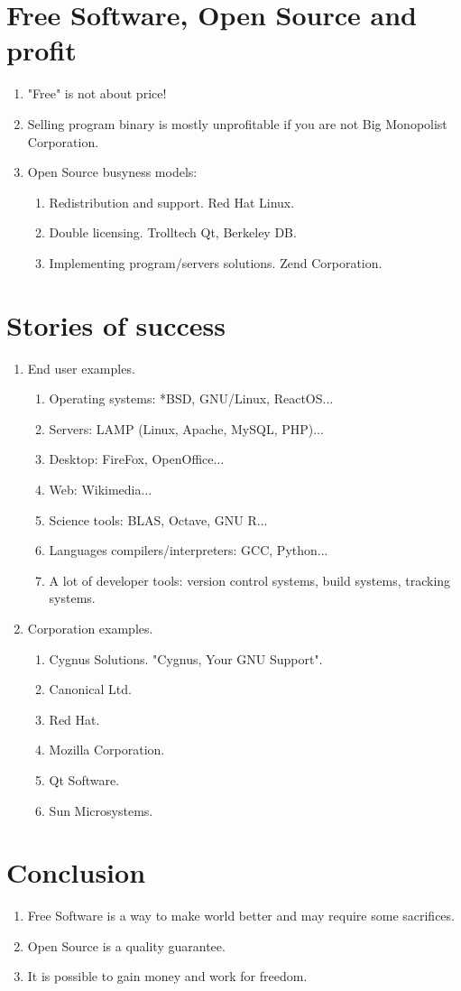 \documentclass[10pt,a4paper]{article}
\begin{document}
\section{Free Software, Open Source and profit}
\begin{enumerate}
  \item "Free" is not about price!
  \item Selling program binary is mostly unprofitable if you are not Big Monopolist Corporation.
  \item Open Source busyness models:
  \begin{enumerate}
    \item Redistribution and support. Red Hat Linux.
    \item Double licensing. Trolltech Qt, Berkeley DB.
    \item Implementing program/servers solutions. Zend Corporation.
  \end{enumerate}
\end{enumerate}

\section{Stories of success}
\begin{enumerate}
  \item End user examples.
  \begin{enumerate}
    \item Operating systems: *BSD, GNU/Linux, ReactOS...
    \item Servers: LAMP (Linux, Apache, MySQL, PHP)...
    \item Desktop: FireFox, OpenOffice...
    \item Web: Wikimedia...
    \item Science tools: BLAS, Octave, GNU R...
    \item Languages compilers/interpreters: GCC, Python...
    \item A lot of developer tools: version control systems, build systems, tracking systems.
  \end{enumerate}
  \item Corporation examples.
  \begin{enumerate}
    \item Cygnus Solutions. "Cygnus, Your GNU Support".
    \item Canonical Ltd.
    \item Red Hat.
    \item Mozilla Corporation.
    \item Qt Software.
    \item Sun Microsystems.
  \end{enumerate}
\end{enumerate}

\section{Conclusion}
\begin{enumerate}
  \item Free Software is a way to make world better and may require some 
sacrifices.
  \item Open Source is a quality guarantee.
  \item It is possible to gain money and work for freedom.
\end{enumerate}
\end{document}
